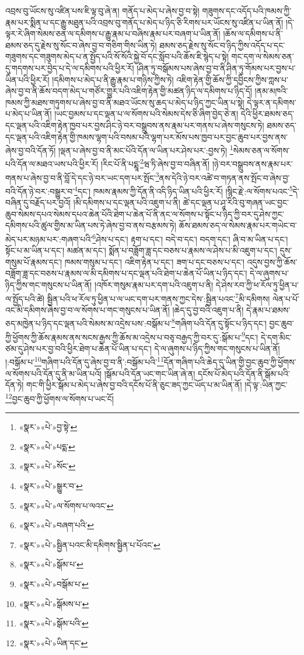 འབྲས་བུ་ཡོངས་སུ་འཛིན་པས་ཇི་ལྟ་བུ་ཞེ་ན། གནོད་པ་མེད་པ་ཞེས་བྱ་བ་སྟེ། གཟུགས་དང་འདོད་པའི་ཁམས་ཀྱི་རྣམ་པར་སྨིན་པ་དང་རྒྱུ་མཐུན་པའི་འབྲས་བུ་གནོད་པ་མེད་པ་ཉིད་ཅི་རིགས་པར་ཡོངས་སུ་འཛིན་པ་ཡིན་ནོ། །དེ་ལྟར་རེ་ཞིག་སེམས་ཅན་ལ་དམིགས་པ་རྒྱུ་རྣམ་པ་བཞིས་རྣམ་པར་བཞག་པ་ཡིན་ནོ། །ཆོས་ལ་དམིགས་པ་ནི་ཐམས་ཅད་དུ་རྗེས་སུ་སོང་བ་ཞེས་བྱ་བ་གཅིག་གིས་ཡིན་ཏེ། ཐམས་ཅད་རྗེས་སུ་སོང་བ་ཉིད་ཀྱིས་འདོད་པ་དང་གཟུགས་དང་གཟུགས་མེད་པ་ན་སྤྱོད་པའི་སོ་སོའི་སྐྱེ་བོ་དང་སློབ་པའི་ཆོས་ཇི་སྙེད་པ་སྟེ། གང་དག་ལ་སེམས་ཅན་དུ་གདགས་པར་བྱེད་པ་དེ་ལ་དམིགས་པའི་ཕྱིར་རོ། །ཤིན་ཏུ་བསྒོམས་པས་ཞེས་བྱ་བ་ནི་ཤིན་ཏུ་གོམས་པར་བྱས་པ་ཡིན་པའི་ཕྱིར་རོ། །དམིགས་པ་མེད་པ་ནི་རྒྱུ་རྣམ་པ་གཉིས་ཀྱིས་ཏེ། འཇིག་རྟེན་གྱི་ཆོས་ཀྱི་དབྱིངས་ཀྱིས་ཀླས་པ་ཞེས་བྱ་བ་ནི་ཆོས་བདག་མེད་པ་གཙོར་གྱུར་པའི་འཇིག་རྟེན་གྱི་མཚན་ཉིད་ལ་དམིགས་པ་ཉིད་དོ། །ནམ་མཁའི་ཁམས་ཀྱི་མཐས་གཏུགས་པ་ཞེས་བྱ་བ་ནི་མཐའ་ཡོངས་སུ་ཆད་པ་མེད་པ་ཉིད་ཀྱང་ཡིན་པ་སྟེ། དེ་ལྟར་ན་དམིགས་པ་མེད་པ་ཡིན་ནོ། །ཡང་བྱམས་པ་དང་ལྡན་པ་ལ་སོགས་པའི་སེམས་དེས་ཅི་ཞིག་བྱེད་ཅེ་ན། དེའི་ཕྱིར་ཐམས་ཅད་དང་ལྡན་པའི་འཇིག་རྟེན་ཁྱབ་པར་བྱས་ཤིང་ཉེ་བར་བསྒྲུབས་ནས་རྣམ་པར་གནས་པ་ཞེས་གསུངས་ཏེ། ཐམས་ཅད་དང་ལྡན་པའི་འཇིག་རྟེན་གྱི་ཁམས་ལྷག་པའི་བསམ་པའི་ལྷག་པར་མོས་པས་ཁྱབ་པར་བྱང་ཆུབ་པར་བྱས་ནས་ཞེས་བྱ་བའི་དོན་ཏོ། །ལྡན་པ་ཞེས་བྱ་བ་ནི་མང་པོའི་དོན་ལ་ཡིན་པར་ཤེས་པར་:བྱས་ཏེ། \footnote{«སྣར་»«པེ་»བྱ་སྟེ་}སེམས་ཅན་ལ་སོགས་པའི་དོན་ལ་མཐའ་ཡས་པའི་ཕྱིར་རོ། །རིང་པོ་ནི་པདྨཱ་\footnote{«སྣར་»«པེ་»པདྨ་}ཝ་ཏི་ཞེས་བྱ་བ་བཞིན་ནོ། །ཉེ་བར་བསྒྲུབས་ནས་རྣམ་པར་གནས་པ་ཞེས་བྱ་བ་ནི་བློ་དེ་དང་ཉེ་བར་ཡང་དག་པར་སྤོང་\footnote{«སྣར་»«པེ་»སོང་}ནས་དེའི་ཉེ་བར་འཚེ་བ་གཏན་ནས་སྤོང་བ་ཞེས་བྱ་བའི་དོན་ཉེ་བར་:བསྒྱུར་བ་\footnote{«སྣར་»«པེ་»སྒྱུར་བ་}དང་། ཁམས་རྣམས་ཀྱི་དོན་ནི་འདི་ཉིད་ཡིན་པའི་ཕྱིར་རོ། །སྙིང་རྗེ་:ལ་སོགས་པའང་\footnote{«སྣར་»«པེ་»ལ་སོགས་པ་ལའང་}དེ་བཞིན་དུ་བརྗོད་པར་བྱའོ། །མི་དམིགས་པ་དང་ལྡན་པའི་འཇུག་པ་ནི། ཚེ་དང་ལྡན་པ་ཤཱ་རིའི་བུ་གཞན་ཡང་བྱང་ཆུབ་སེམས་དཔའ་སེམས་དཔའ་ཆེན་པོའི་ཐེག་པ་ཆེན་པོ་ནི་ནང་ལ་སོགས་པ་སྟོང་པ་ཉིད་ཀྱི་བར་དུ་ཤེས་ཀྱང་དམིགས་པའི་ཚུལ་གྱིས་མ་ཡིན་པས་ཏེ་ཞེས་བྱ་བ་ནས་བརྩམས་ཏེ། ཆོས་ཐམས་ཅད་ལ་སེམས་རྣམ་པར་གཡེང་བ་མེད་པར་མཉམ་པར་:གཞག་པའི་\footnote{«སྣར་»«པེ་»བཞག་པའི་}ཤེས་པ་དང་། རྟག་པ་དང་། བདེ་བ་དང་། བདག་དང་། ཞི་བ་མ་ཡིན་པ་དང་། སྟོང་པ་མ་ཡིན་པ་དང་། མཚན་མ་དང་། སྨོན་པ་བཟློག་ཟླ་དང་བཅས་པ་རྣམས་ལ་ཤེས་པ་མི་འཇུག་པ་དང་། དུས་གསུམ་པོ་རྣམས་དང་། ཁམས་གསུམ་པ་དང་། འཇིག་རྟེན་པ་དང་། ཟག་པ་དང་བཅས་པ་དང་། འདུས་བྱས་ཀྱི་ཆོས་བཟློག་ཟླ་དང་བཅས་པ་རྣམས་ལ་མི་དམིགས་པ་དང་ལྡན་པའི་ཐེག་པ་ཆེན་པོ་ཡིན་པ་ཉིད་དང་། དེ་ལ་ཞུགས་པ་ཉིད་ཀྱིས་གང་གསུངས་པ་ཡིན་ནོ། །འཁོར་གསུམ་རྣམ་པར་དག་པའི་འཇུག་པ་ནི། དེ་ཤེས་རབ་ཀྱི་ཕ་རོལ་ཏུ་ཕྱིན་པ་ལ་སྤྱོད་པའི་ཚེ། སྦྱིན་པའི་ཕ་རོལ་ཏུ་ཕྱིན་པ་ལ་ཡང་དག་པར་གནས་ཀྱང་དེས་:སྦྱིན་པའང་\footnote{«སྣར་»«པེ་»སྦྱིན་པའང་མི་དམིགས་སྦྱིན་པ་པོའང་}མི་དམིགས། ལེན་པ་པོ་འང་མི་དམིགས་ཞེས་བྱ་བ་ལ་སོགས་པ་གང་གསུངས་པ་ཡིན་ནོ། །ཆེད་དུ་བྱ་བའི་འཇུག་པ་ནི། དེ་རྣམ་པ་ཐམས་ཅད་མཁྱེན་པ་ཉིད་དང་ལྡན་པའི་སེམས་མ་འདྲེས་པས་:བསྒོམ་པ་\footnote{«སྣར་»«པེ་»སྒོམ་པ་}གཞིག་པའི་དོན་དུ་སྟོང་པ་ཉིད་དང་། བྱང་ཆུབ་ཀྱི་ཕྱོགས་ཀྱི་ཆོས་རྣམས་ནས་སངས་རྒྱས་ཀྱི་ཆོས་མ་འདྲེས་པ་བཅྭ་བརྒྱད་ཀྱི་བར་དུ་:སྒོམ་པ་\footnote{«སྣར་»«པེ་»བསྒོམ་པ་}དང་། དེ་དག་མིང་ཙམ་དུ་ཤེས་པར་བྱ་བའི་ཕྱིར་ཐེག་པ་ཆེན་པོ་ཡིན་པ་དང་། དེ་ལ་ཞུགས་པ་ཉིད་ཀྱིས་གང་གསུངས་པ་ཡིན་ནོ། །:བསྒོམ་པ་\footnote{«སྣར་»«པེ་»སྒོམས་པ་}གཞིག་པའི་དོན་དུ་ཞེས་བྱ་བ་ནི་:བསྒོམ་པའི་\footnote{«སྣར་»«པེ་»སྒོམ་པའི་}དོན་གཞིག་པའི་ཆེད་དུ་ཡིན་གྱི་བྱང་ཆུབ་ཀྱི་ཕྱོགས་ལ་སོགས་པའི་དོན་དུ་ནི་མ་ཡིན་པའོ། །སྒོམ་པའི་དོན་ཡང་གང་ཡིན་ཞེ་ན། དངོས་པོ་མེད་པའི་དོན་ནི་སྒོམ་པའི་དོན་ཏེ། གང་གི་ཕྱིར་སྒོམ་པ་མེད་པ་ཞེས་བྱ་བའི་དངོས་པོ་ནི་ཅུང་ཟད་ཀྱང་ཡོད་པ་མ་ཡིན་ནོ། །དེ་ལྟ་:ཡིན་ཀྱང་\footnote{«སྣར་»«པེ་»ཡིན་དང་}བྱང་ཆུབ་ཀྱི་ཕྱོགས་ལ་སོགས་པ་ཡང་ངོ། 